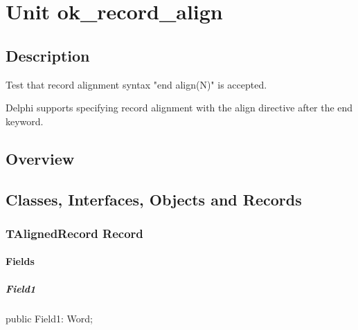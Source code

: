 \documentclass{report}
\begin{document}
\newlength{\tmplength}
\chapter{Unit ok{\_}record{\_}align}
\section{Description}
Test that record alignment syntax "end align(N)" is accepted.\hfill\vspace*{1ex}

 Delphi supports specifying record alignment with the align directive after the end keyword.
\section{Overview}
\begin{description}
\item[\texttt{\begin{ttfamily}TAlignedRecord\end{ttfamily} Record}]
\item[\texttt{\begin{ttfamily}TAnotherAligned\end{ttfamily} Record}]
\end{description}
\section{Classes, Interfaces, Objects and Records}
\subsection*{TAlignedRecord Record}
\subsubsection*{\large{\textbf{Fields}}\normalsize\hspace{1ex}\hfill}
\paragraph*{Field1}\hspace*{\fill}

\begin{list}{}{
\setlength{\itemindent}{0cm}
\setlength{\listparindent}{0cm}
\setlength{\leftmargin}{\evensidemargin}
\addtolength{\leftmargin}{\tmplength}
\settowidth{\labelsep}{X}
\addtolength{\leftmargin}{\labelsep}
\setlength{\labelwidth}{\tmplength}
}
\begin{flushleft}
\item[\textbf{Declaration}\hfill]
\begin{ttfamily}
public Field1: Word;\end{ttfamily}


\end{flushleft}
\end{list}
\end{document}
